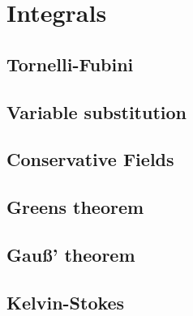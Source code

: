 \documentclass{article}
\theoremstyle{plain}
\begin{document}
\section{Integrals}

\subsection{Tornelli-Fubini}

\subsection{Variable substitution}

\subsection{Conservative Fields}

\subsection{Greens theorem}

\subsection{Gau{\ss}' theorem}

\subsection{Kelvin-Stokes}
\end{document}
